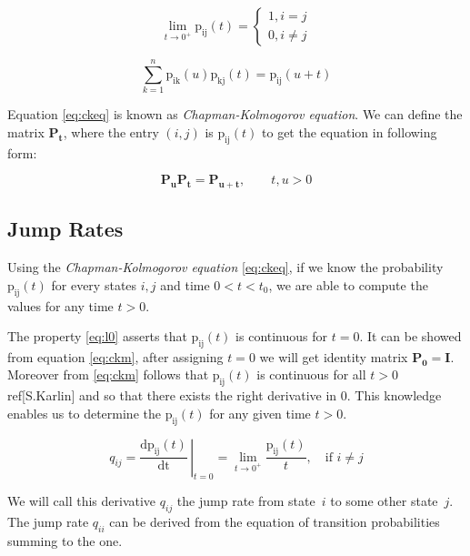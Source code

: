 \documentclass[thesis=M,english]{FITthesis}[2012/10/20]
\newcommand{\matr}[1]{\mathbf{#1}}
\begin{document}
\begin{equation}\label{eq:l0}  
\lim_{t \to 0^+} \mathrm{p_{ij}}(t)= 
\begin{cases}
1, i = j\\
0, i \neq j
\end{cases}
\end{equation}

\begin{equation}\label{eq:ckeq}
\sum_{k = 1}^n\mathrm{p_{ik}}(u)\mathrm{p_{kj}}(t) = \mathrm{p_{ij}}(u+t)     
\end{equation}

Equation \eqref{eq:ckeq} is known as \textit{Chapman-Kolmogorov equation}. 
We can define the matrix $\matr{P_t}$, where the entry $(i,j)$ is $\mathrm{p_{ij}}(t)$ to get the equation in following form:

\begin{equation}\label{eq:ckm}
\matr{P_u} \matr{P_t} = \matr{P_{u+t}},   \qquad t,u > 0  
\end{equation}

\subsection{ Jump Rates }

Using the \textit{Chapman-Kolmogorov equation} \eqref{eq:ckeq}, if we know the probability $\mathrm{p_{ij}}(t)$ for every states $i,j$ and time $0 < t < t_0$, we are able to compute the values for any time $t > 0$. 

The property \eqref{eq:l0}  asserts that $\mathrm{p_{ij}}(t)$ is continuous for $t=0$. It can be showed from equation \eqref{eq:ckm}, after assigning $t=0$ we will get identity matrix $\matr{P_0} = \matr{I}$.
Moreover from \eqref{eq:ckm} follows that $\mathrm{p_{ij}}(t)$ is continuous for all $t>0$ ref[S.Karlin] and so that there exists the right derivative in 0. This knowledge enables us to determine the $\mathrm{p_{ij}}(t)$ for any given time $t>0$.   

\begin{equation}
q_{ij} =  \left.\frac{\mathrm{d}\mathrm{p_{ij}}(t)}{\mathrm{dt}} \,\right|_{t=0} = \lim_{t \to 0^+} \frac{\mathrm{p_{ij}}(t)}{t}, \quad \text{if } i\neq j     
\end{equation}

We will call this derivative $q_{ij}$ the jump rate from state~$i$ to some other state~$j$. The jump rate $q_{ii}$ can be derived from the equation of transition probabilities summing to the one.
\end{document}
